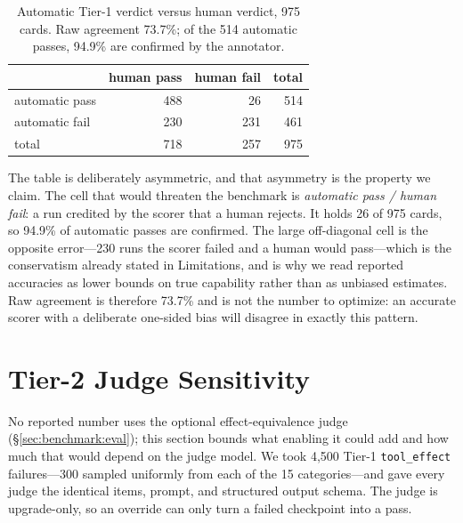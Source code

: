 \begin{table}[h]
  \centering \small
  \begin{tabular}{lrrr}
    \toprule
    & human pass & human fail & total \\
    \midrule
    automatic pass & 488 & 26  & 514 \\
    automatic fail & 230 & 231 & 461 \\
    \midrule
    total          & 718 & 257 & 975 \\
    \bottomrule
  \end{tabular}
  \caption{Automatic Tier-1 verdict versus human verdict, 975 cards. Raw
    agreement 73.7\%; of the 514 automatic passes, 94.9\% are confirmed by the
    annotator.}
  \label{tab:confusion}
\end{table}

\noindent The table is deliberately asymmetric, and that asymmetry is the
property we claim. The cell that would threaten the benchmark is
\emph{automatic pass / human fail}: a run credited by the scorer that a human
rejects. It holds 26 of 975 cards, so 94.9\% of automatic passes are
confirmed. The large off-diagonal cell is the opposite error---230 runs the
scorer failed and a human would pass---which is the conservatism already
stated in Limitations, and is why we read reported accuracies as lower bounds
on true capability rather than as unbiased estimates. Raw agreement is
therefore 73.7\% and is not the number to optimize: an accurate scorer with a
deliberate one-sided bias will disagree in exactly this pattern.

\section{Tier-2 Judge Sensitivity}
\label{app:tier2}
No reported number uses the optional effect-equivalence judge
(\S\ref{sec:benchmark:eval}); this section bounds what enabling it could add and
how much that would depend on the judge model. We took 4{,}500 Tier-1
\texttt{tool\_effect} failures---300 sampled uniformly from each of the 15
categories---and gave every judge the identical items, prompt, and structured
output schema. The judge is upgrade-only, so an override can only turn a failed
checkpoint into a pass.

